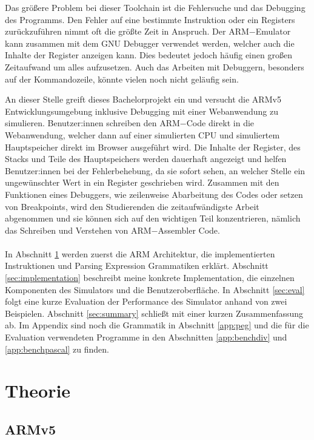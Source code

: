 \documentclass[a4paper, 11pt, onecolumn]{article}
\begin{document}
Das größere Problem bei dieser Toolchain ist die Fehlersuche und das Debugging des Programms. Den Fehler auf eine bestimmte Instruktion oder ein Registers zurückzuführen nimmt oft die größte Zeit in Anspruch. Der ARM$-$Emulator kann zusammen mit dem GNU Debugger \cite{gdb}  verwendet werden, welcher auch die Inhalte der Register anzeigen kann. Dies bedeutet jedoch häufig einen großen Zeitaufwand um alles aufzusetzen. Auch das Arbeiten mit Debuggern, besonders auf der Kommandozeile, könnte vielen noch nicht geläufig sein. 

An dieser Stelle greift dieses Bachelorprojekt ein und versucht die ARMv5 Entwicklungsumgebung inklusive Debugging mit einer Webanwendung zu simulieren. Benutzer:innen schreiben den ARM$-$Code direkt in die Webanwendung, welcher dann auf einer simulierten CPU und simuliertem Hauptspeicher direkt im Browser ausgeführt wird. Die Inhalte der Register, des Stacks und Teile des Hauptspeichers werden dauerhaft angezeigt und helfen Benutzer:innen bei der Fehlerbehebung, da sie sofort sehen, an welcher Stelle ein ungewünschter Wert in ein Register geschrieben wird. Zusammen mit den Funktionen eines Debuggers, wie zeilenweise Abarbeitung des Codes oder setzen von Breakpoints, wird den Studierenden die zeitaufwändigste Arbeit abgenommen und sie können sich auf den wichtigen Teil konzentrieren, nämlich das Schreiben und Verstehen von ARM$-$Assembler Code.\\ \\
In Abschnitt \ref{sec:theory} werden zuerst die ARM Architektur, die implementierten Instruktionen und Parsing Expression Grammatiken erklärt. Abschnitt \ref{sec:implementation} beschreibt meine konkrete Implementation, die einzelnen Komponenten des Simulators und die Benutzeroberfläche. In Abschnitt \ref{sec:eval} folgt eine kurze Evaluation der Performance des Simulator anhand von zwei Beispielen. Abschnitt \ref{sec:summary} schließt mit einer kurzen Zusammenfassung ab. Im Appendix sind noch die Grammatik in Abschnitt \ref{app:peg} und die für die Evaluation verwendeten Programme in den Abschnitten \ref{app:benchdiv} und \ref{app:benchpascal} zu finden.

\newpage

\section{Theorie}\label{sec:theory}

\subsection{ARMv5}\label{sec:armv5}
\end{document}
